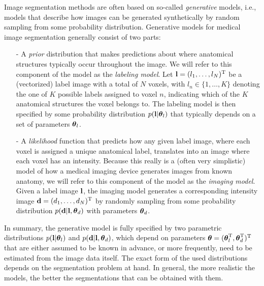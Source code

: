 \documentclass[10pt,twoside]{book}
\begin{document}
Image segmentation methods are often based on so-called \emph{generative} models, i.e., models that describe how images can be generated synthetically by random sampling from some probability distribution. 
Generative models for medical image segmentation generally consist of two parts:
\begin{itemize}
 \item[-] A \emph{prior} distribution that makes predictions about where anatomical structures typically occur throughout the image. 
          We will refer to this component of the model as the \emph{labeling model}. 
          Let $\mathbf{l} = ( l_1, \ldots, l_N )^\mathrm{T}$ be a (vectorized) label image with a total of $N$ voxels, with $l_n \in \{ 1, \ldots, K \}$ denoting the one of $K$ possible labels assigned to voxel $n$, indicating which of the $K$ anatomical structures the voxel belongs to. The labeling model is then specified by some probability distribution $p( \mathbf{l} | {\mbox{\boldmath {${\theta}$}}}_l )$ that typically depends on a set of parameters ${\mbox{\boldmath {${\theta}$}}}_l$.%
 \item[-] A \emph{likelihood} function that predicts how any given label image, where each voxel is assigned a unique anatomical label, translates into an image where each voxel has an intensity. Because this really is a (often very simplistic) model of how a medical imaging device generates images from known anatomy, we will refer to this component of the model as the \emph{imaging model}. Given a label image $\mathbf{l}$, the imaging model generates a corresponding intensity image $\mathbf{d} = ( d_1, \ldots, d_N )^\mathrm{T}$ by randomly sampling from some probability distribution $p( \mathbf{d} | \mathbf{l}, {\mbox{\boldmath {${\theta}$}}}_d )$ with parameters ${\mbox{\boldmath {${\theta}$}}}_d$. 
\end{itemize}
In summary, the generative model is fully specified by two parametric distributions $p( \mathbf{l} | {\mbox{\boldmath {${\theta}$}}}_l )$ and $p( \mathbf{d} | \mathbf{l}, {\mbox{\boldmath {${\theta}$}}}_d )$,  which depend on parameters ${\mbox{\boldmath {${\theta}$}}} = ( {\mbox{\boldmath {${\theta}$}}}_l^\mathrm{T}, {\mbox{\boldmath {${\theta}$}}}_d^\mathrm{T} )^\mathrm{T}$ that are either assumed to be known in advance, or more frequently, need to be estimated from the image data itself. The exact form of the used distributions depends on the segmentation problem at hand. In general, the more realistic the models, the better the segmentations that can be obtained with them.
\end{document}
